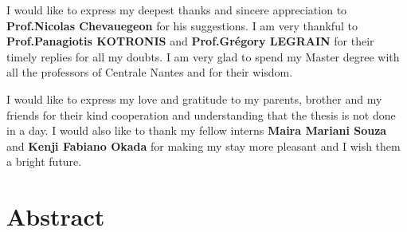 \documentclass[12pt,twoside]{report}
\begin{document}
I would like to express my deepest thanks and sincere appreciation to \textbf{Prof.Nicolas Chevauegeon} for his suggestions. I am very thankful to \textbf{Prof.Panagiotis KOTRONIS} and \textbf{Prof.Grégory LEGRAIN} for their timely replies for all my doubts. I am very glad to spend my Master degree with all the professors of Centrale Nantes and for their wisdom.

I would like to express my love and gratitude to my parents, brother and my friends for their kind cooperation and understanding that the thesis is not done in a day. I would also like to thank my fellow interns \textbf{Maira Mariani Souza} and \textbf{Kenji Fabiano Okada} for making my stay more pleasant and I wish them a bright future. 
 



\chapter*{Abstract}
\end{document}
